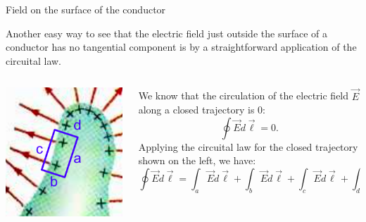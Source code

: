 \begin{frame}{Field on the surface of the conductor}

Another easy way to see that the electric field just outside the surface
of a conductor has no tangential component
is by a straightforward application of the circuital law.\\

\vspace{0.3cm}

\begin{columns}
  \begin{column}{0.30\textwidth}
   \begin{center}
     \includegraphics[width=0.99\textwidth]{./images/schematics/conductor_no_tangential_component_circuital_law.png}\\
   \end{center}
  \end{column}
  \begin{column}{0.70\textwidth}
     We know that the circulation of the electric field $\vec{E}$ along a closed trajectory is 0:
     \begin{equation*}
       \oint \vec{E} d\vec{\ell} = 0.
     \end{equation*}
     Applying the circuital law for the closed trajectory shown on the left, we have:
     \begin{equation*}
       \oint \vec{E} d\vec{\ell} =
        \int_{a} \vec{E} d\vec{\ell} + \int_{b} \vec{E} d\vec{\ell} + \int_{c} \vec{E} d\vec{\ell} + \int_{d} \vec{E} d\vec{\ell} = 0.
     \end{equation*}
  \end{column}
\end{columns}

\end{frame}

